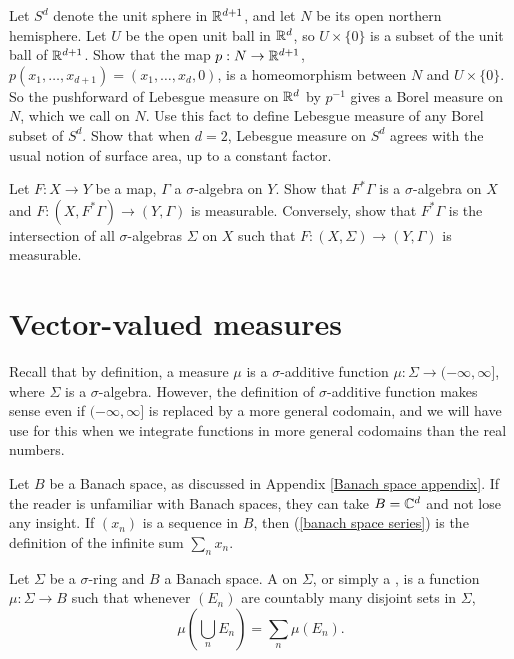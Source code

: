 \begin{exercise}
\label{Lebesgue measure on sphere}
Let $S^d$ denote the unit sphere in $\mathbb{R}^{d+1}$, and let $N$ be its open northern hemisphere.
Let $U$ be the open unit ball in $\mathbb{R}^d$, so $U \times \{0\}$ is a subset of the unit ball of $\mathbb{R}^{d+1}$.
Show that the map $p: N \to \mathbb{R}^{d+1}$, $p(x_1, \dots, x_{d+1}) = (x_1, \dots, x_d, 0)$, is a homeomorphism between $N$ and $U \times \{0\}$.
So the pushforward of Lebesgue measure on $\mathbb{R}^d$ by $p^{-1}$ gives a Borel measure on $N$, which we call  on $N$.
Use this fact to define Lebesgue measure of any Borel subset of $S^d$.
Show that when $d = 2$, Lebesgue measure on $S^d$ agrees with the usual notion of surface area, up to a constant factor.
\end{exercise}

\begin{exercise}
\label{pullback makes sense}
Let $F: X \to Y$ be a map, $\Gamma$ a $\sigma$-algebra on $Y$.
Show that $F^*\Gamma$ is a $\sigma$-algebra on $X$ and $F: (X, F^*\Gamma) \to (Y, \Gamma)$ is measurable.
Conversely, show that $F^*\Gamma$ is the intersection of all $\sigma$-algebras $\Sigma$ on $X$ such that $F: (X, \Sigma) \to (Y, \Gamma)$ is measurable.
\end{exercise}

\section{Vector-valued measures}
Recall that by definition, a measure $\mu$ is a $\sigma$-additive function $\mu: \Sigma \to (-\infty, \infty]$, where $\Sigma$ is a $\sigma$-algebra.
However, the definition of $\sigma$-additive function makes sense even if $(-\infty, \infty]$ is replaced by a more general codomain, and we will have use for this when we integrate functions in more general codomains than the real numbers.

\begin{subsec}
Let $B$ be a Banach space, as discussed in Appendix \ref{Banach space appendix}.
If the reader is unfamiliar with Banach spaces, they can take $B = \mathbb{C}^d$ and not lose any insight.
If $(x_{n})$ is a sequence in $B$, then (\ref{banach space series}) is the definition of the infinite sum $\sum_{n} x_{n}$.
\end{subsec}

\begin{definition}
Let $\Sigma$ be a $\sigma$-ring and $B$ a Banach space.
A  on $\Sigma$, or simply a , is a function $\mu: \Sigma \to B$ such that whenever $(E_{n})$ are countably many disjoint sets in $\Sigma$,
\[\mu\left(\bigcup_{n} E_{n}\right) = \sum_{n} \mu(E_{n}).\]
\end{definition}

